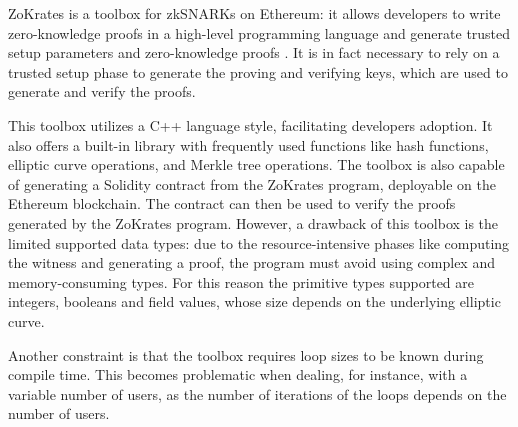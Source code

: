ZoKrates is a toolbox for zkSNARKs on Ethereum: it allows developers to write zero-knowledge proofs in a high-level programming language and generate trusted setup parameters and zero-knowledge proofs \cite{eberhardt_ZoKrates_2018}. It is in fact necessary to rely on a trusted setup phase to generate the proving and verifying keys, which are used to generate and verify the proofs.

This toolbox utilizes a C++ language style, facilitating developers adoption. It also offers a built-in library with frequently used functions like hash functions, elliptic curve operations, and Merkle tree operations. The toolbox is also capable of generating a Solidity contract from the ZoKrates program, deployable on the Ethereum blockchain. The contract can then be used to verify the proofs generated by the ZoKrates program. However, a drawback of this toolbox is the limited supported data types: due to the resource-intensive phases like computing the witness and generating a proof, the program must avoid using complex and memory-consuming types. For this reason the primitive types supported are integers, booleans and field values, whose size depends on the underlying elliptic curve.

Another constraint is that the toolbox requires loop sizes to be known during compile time. This becomes problematic when dealing, for instance, with a variable number of users, as the number of iterations of the loops depends on the number of users.

